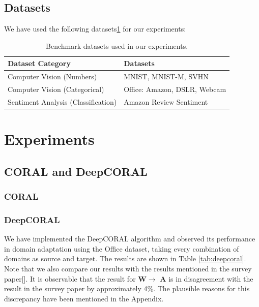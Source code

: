 \documentclass{article}
\begin{document}
\subsection{Datasets}
We have used the following datasets\ref{tab:datasets} for our experiments:
\begin{table}[h]
  \centering
  \caption{Benchmark datasets used in our experiments.}
  \label{tab:datasets}
  \begin{tabular}{ll}
      \toprule
      \textbf{Dataset Category} & \textbf{Datasets} \\
      \midrule
      Computer Vision (Numbers)     & MNIST, MNIST-M, SVHN \\
      Computer Vision (Categorical) & Office: Amazon, DSLR, Webcam \\
      Sentiment Analysis (Classification)  & Amazon Review Sentiment \\
      \bottomrule
  \end{tabular}
\end{table}


\section{Experiments}
\subsection{CORAL and DeepCORAL}
\subsubsection{CORAL}

\subsubsection{DeepCORAL}
We have implemented the DeepCORAL algorithm and observed its performance in domain adaptation using the Office dataset, taking every combination of domains as source and target. The results are shown in Table \ref{tab:deepcoral}. Note that we also compare our results with the results mentioned in the survey paper[]. It is observable that the result for \textbf{W}$\rightarrow$ \textbf{A} is in disagreement with the result in the survey paper by approximately 4\%. The plausible reasons for this discrepancy have been mentioned in the Appendix.
 
\end{document}
